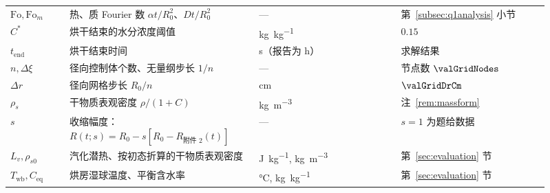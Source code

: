 \begin{longtable}{@{}>{\raggedright\arraybackslash}p{0.10\linewidth}>{\raggedright\arraybackslash}p{0.32\linewidth}>{\raggedright\arraybackslash}p{0.24\linewidth}>{\raggedright\arraybackslash}p{0.25\linewidth}@{}}
$\mathrm{Fo},\mathrm{Fo}_m$ & 热、质 Fourier 数 $\alpha t/R_0^2$、$Dt/R_0^2$ & --- & 第~\ref{subsec:q1analysis} 小节 \\
$C^\ast$ & 烘干结束的水分浓度阈值 & \si{\kilo\gram\per\kilo\gram} & $0.15$ \\
$t_{\mathrm{end}}$ & 烘干结束时间 & \si{\second}（报告为 h） & 求解结果 \\
$n,\Delta\xi$ & 径向控制体个数、无量纲步长 $1/n$ & --- & 节点数 $\valGridNodes$ \\
$\Delta r$ & 径向网格步长 $R_0/n$ & \si{\centi\meter} & $\valGridDrCm$ \\
$\rho_s$ & 干物质表观密度 $\rho/(1+C)$ & \si{\kilo\gram\per\cubic\meter} & 注~\ref{rem:massform} \\
$s$ & 收缩幅度：$R(t;s)=R_0-s[R_0-R_{\text{附件 2}}(t)]$ & --- & $s=1$ 为题给数据 \\
$L_v,\rho_{s0}$ & 汽化潜热、按初态折算的干物质表观密度 & \si{\joule\per\kilo\gram}, \si{\kilo\gram\per\cubic\meter} & 第~\ref{sec:evaluation} 节 \\
$T_{\mathrm{wb}},C_{\mathrm{eq}}$ & 烘房湿球温度、平衡含水率 & \si{\celsius}, \si{\kilo\gram\per\kilo\gram} & 第~\ref{sec:evaluation} 节 \\
\end{longtable}
\endgroup
